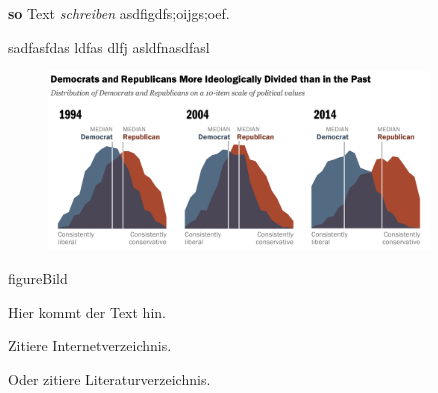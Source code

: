 \textbf{so} Text \textit{schreiben} asdfigdfs;oijgs;oef.

sadfasfdas ldfas dlfj asldfnasdfasl

	\begin{figure}[ht]
		\centering
		\includegraphics[width=0.9\textwidth]{images/Kapitel1/PoliticalPolarization}
	\end{figure}
	

{figureBild}

Hier kommt der Text hin.

Zitiere  Internetverzeichnis.

Oder zitiere  Literaturverzeichnis.